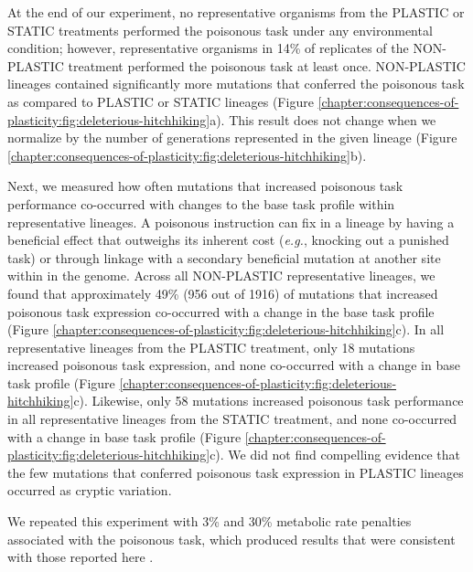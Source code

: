 

At the end of our experiment, no representative organisms from the PLASTIC or STATIC treatments performed the poisonous task under any environmental condition; however, representative organisms in 14\% of replicates of the NON-PLASTIC treatment performed the poisonous task at least once. 
NON-PLASTIC lineages contained significantly more mutations that conferred the poisonous task as compared to PLASTIC or STATIC lineages (Figure \ref{chapter:consequences-of-plasticity:fig:deleterious-hitchhiking}a).
This result does not change when we normalize by the number of generations represented in the given lineage (Figure \ref{chapter:consequences-of-plasticity:fig:deleterious-hitchhiking}b).

Next, we measured how often mutations that increased poisonous task performance co-occurred with changes to the base task profile within representative lineages.
A poisonous instruction can fix in a lineage by having a beneficial effect that outweighs its inherent cost (\textit{e.g.}, knocking out a punished task) or through linkage with a secondary beneficial mutation at another site within in the genome.
Across all NON-PLASTIC representative lineages, we found that approximately 49\% (956 out of 1916) of mutations that increased poisonous task expression co-occurred with a change in the base task profile (Figure \ref{chapter:consequences-of-plasticity:fig:deleterious-hitchhiking}c).
In all representative lineages from the PLASTIC treatment, only 18 mutations increased poisonous task expression, and none co-occurred with a change in base task profile (Figure \ref{chapter:consequences-of-plasticity:fig:deleterious-hitchhiking}c).
Likewise, only 58 mutations increased poisonous task performance in all representative lineages from the STATIC treatment, and none co-occurred with a change in base task profile (Figure \ref{chapter:consequences-of-plasticity:fig:deleterious-hitchhiking}c).
We did not find compelling evidence that the few mutations that conferred poisonous task expression in PLASTIC lineages occurred as cryptic variation.

We repeated this experiment with 3\% and 30\% metabolic rate penalties associated with the poisonous task, which produced results that were consistent with those reported here \citep{consequences_of_plasticity_supplemental_material_2021}.